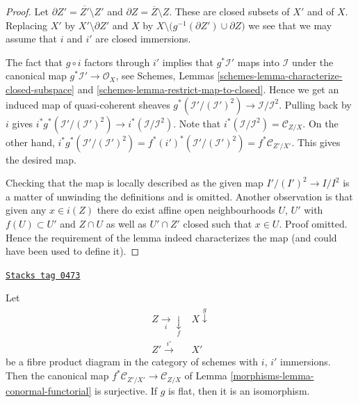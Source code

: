 \begin{proof}
Let $\partial Z' = \overline{Z'} \setminus Z'$ and
$\partial Z = \overline{Z} \setminus Z$. These are closed subsets of $X'$ and
of $X$. Replacing $X'$ by $X' \setminus \partial Z'$ and $X$ by
$X \setminus \big(g^{-1}(\partial Z') \cup \partial Z\big)$ we
see that we may assume that $i$ and $i'$ are closed immersions.

\medskip\noindent
The fact that $g \circ i$ factors through $i'$ implies that
$g^*\mathcal{I}'$ maps into $\mathcal{I}$ under the canonical
map $g^*\mathcal{I}' \to \mathcal{O}_X$, see
Schemes, Lemmas
\ref{schemes-lemma-characterize-closed-subspace} and
\ref{schemes-lemma-restrict-map-to-closed}.
Hence we get an induced map of quasi-coherent sheaves
$g^*(\mathcal{I}'/(\mathcal{I}')^2) \to \mathcal{I}/\mathcal{I}^2$.
Pulling back by $i$ gives
$i^*g^*(\mathcal{I}'/(\mathcal{I}')^2) \to i^*(\mathcal{I}/\mathcal{I}^2)$.
Note that $i^*(\mathcal{I}/\mathcal{I}^2) = \mathcal{C}_{Z/X}$.
On the other hand,
$i^*g^*(\mathcal{I}'/(\mathcal{I}')^2) =
f^*(i')^*(\mathcal{I}'/(\mathcal{I}')^2) = f^*\mathcal{C}_{Z'/X'}$.
This gives the desired map.

\medskip\noindent
Checking that the map is locally described as the given map
$I'/(I')^2 \to I/I^2$ is a matter of unwinding the definitions
and is omitted. Another observation is that given any
$x \in i(Z)$ there do exist affine open neighbourhoods $U$, $U'$
with $f(U) \subset U'$ and $Z \cap U$ as well as $U' \cap Z'$
closed such that $x \in U$. Proof omitted. Hence the requirement
of the lemma indeed characterizes the map (and could have been used
to define it).
\end{proof}

\begin{lemma}
\label{morphisms-lemma-conormal-functorial-flat}
\href{https://stacks.math.columbia.edu/tag/0473}{\texttt{Stacks tag 0473}}

Let
$$
\begin{array}{cc}Z \underset{i}{\longrightarrow}\underset{f}{\downarrow} & X \overset{g}{\downarrow} \\ Z' \overset{i'}{\longrightarrow} & X'\end{array}
$$
be a fibre product diagram in the category of schemes with
$i$, $i'$ immersions. Then the canonical map
$f^*\mathcal{C}_{Z'/X'} \to \mathcal{C}_{Z/X}$ of
Lemma \ref{morphisms-lemma-conormal-functorial}
is surjective. If $g$ is flat, then it is an isomorphism.
\end{lemma}

